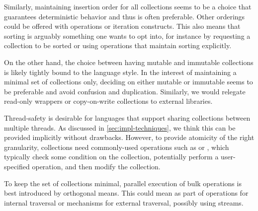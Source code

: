 \documentclass[sigconf, 10pt]{acmart}
\begin{document}
\label{sec:insertion-ordering-choice}
Similarly, maintaining insertion order for all collections seems to be a choice
that guarantees deterministic behavior and thus is often preferable.
Other orderings could be offered with operations or iteration constructs.
This also means that sorting is arguably something one wants to opt into,
for instance by requesting a collection to be sorted or using operations that
maintain sorting explicitly.

On the other hand, the choice between having mutable and immutable collections is likely tightly
bound to the language style.
In the interest of maintaining a minimal set of collections only,
deciding on either mutable or immutable seems to be preferable and avoid confusion and duplication.
Similarly, we would relegate read-only wrappers or copy-on-write collections
to external libraries.

\label{sec:design-thread-safety}
Thread-safety is desirable for languages
that support sharing collections between multiple threads.
As discussed in \cref{sec:impl-techniques},
we think this can be provided implicitly without drawbacks.
However, to provide atomicity of the right granularity,
collections need commonly-used operations
such as  or ,
which typically check some condition on the collection,
potentially perform a user-specified operation, and then modify the collection.


To keep the set of collections minimal,
parallel execution of bulk operations is
best introduced by orthogonal means.
This could mean as part of operations for internal traversal
or mechanisms for external traversal, possibly using streams.
\end{document}
